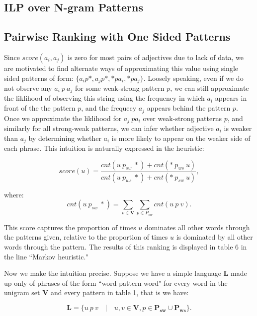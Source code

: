 \subsection{ILP over N-gram Patterns}

\subsection{Pairwise Ranking with One Sided Patterns}

Since $score(a_i, a_j)$ is zero for most pairs of adjectives due to lack of data, we are motivated to find alternate ways of approximating this value using single sided patterns of form: $\{a_i p *, a_j p *, * p a_i, * p a_j\}$. Loosely speaking, even if we do not observe any $a_i \: p \: a_j$ for some weak-strong pattern $p$, we can still approximate the liklihood of observing this string using the frequency in which $a_i$ appears in front of the the pattern $p$, and the frequecy $a_j$ appears behind the pattern $p$. Once we approximate the liklihood for $a_j \: p a_i$ over weak-strong patterns $p$, and similarly for all strong-weak patterns, we can infer whether adjective $a_i$ is weaker than $a_j$ by determining whether $a_i$ is more likely to appear on the weaker side of each phrase. This intuition is naturally expressed in the heuristic:

\[
  score(u) = \frac{ cnt(u \: p_{sw} \: *) + cnt(* \: p_{ws} \: u)  }
                  { cnt(u \: p_{ws} \: *) + cnt(* \: p_{sw} \: u) },
\]

where:
\[cnt( u \: p_{sw} \: *) = \sum_{v \in \mathbf{V}} \sum_{p \in P_{sw}} cnt( u \: p \: v).\]

This score captures the proportion of times $u$ dominates all other words through the patterns given, relative to the proportion of times $u$ is dominated by all other words through the pattern. The results of this ranking is displayed in table 6 in the line ``Markov heuristic."

Now we make the intuition precise. Suppose we have a simple language $\mathbf{L}$ made up only of phrases of the form ``word pattern word" for every word in the unigram set $\mathbf{V}$ and every pattern in table 1, that is we have:

\[ \mathbf{L} = \{ u \: p \: v \quad|\quad u,v \in \mathbf{V}, p \in \mathbf{P_{sw}} \cup \mathbf{P_{ws}} \}. \]

